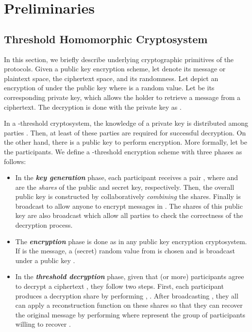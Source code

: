 \documentclass[journal]{IEEEtran}
\begin{document}
\section{Preliminaries}

\subsection{Threshold Homomorphic Cryptosystem}

In this section, we briefly describe underlying cryptographic primitives of the protocols. Given a public key encryption scheme, let  denote its message or plaintext space,  the ciphertext space, and  its randomness. Let  depict an encryption of  under the public key  where  is a random value. Let  be its corresponding private key, which allows the holder to retrieve a message from a ciphertext. The decryption is done with the private key  as .

In a -threshold cryptosystem, the knowledge of a private key is distributed among parties . Then, at least  of these parties are required for successful decryption. On the other hand, there is a public key to perform encryption. More formally, let  be the participants. We define a -threshold encryption scheme with three phases as follows:

\begin{itemize}
  \item In the \emph{\textbf{key generation}} phase, each participant  receives a pair , where  and  are the \emph{shares} of the public and secret key, respectively. Then, the overall public key  is constructed by collaboratively \emph{combining} the shares. Finally  is broadcast to allow anyone to encrypt messages in . The shares of this public key are also broadcast which allow all parties to check the correctness of the decryption process.
  
  \item The \emph{\textbf{encryption}} phase is done as in any public key encryption cryptosystem. If  is the message, a (secret) random value  from  is chosen and  is broadcast under a public key .
	
  \item In the \emph{\textbf{threshold decryption}} phase, given that  (or more) participants agree to decrypt a ciphertext , they follow two steps. First, each participant produces a decryption share by performing , . After broadcasting , they all can apply a reconstruction function  on these shares so that they can recover the original message by performing  where  represent the group of  participants willing to recover . 
\end{itemize}
\end{document}
